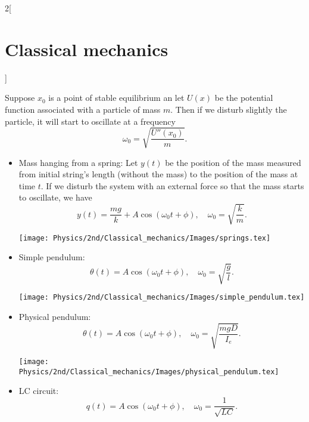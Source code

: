 \documentclass[../../../main.tex]{subfiles}
\begin{document}
\begin{multicols}{2}[\section{Classical mechanics}]
\begin{concept}
    Suppose $x_0$ is a point of stable equilibrium an let $U(x)$ be the potential function associated with a particle of mass $m$. Then if we disturb slightly the particle, it will start to oscillate at a frequency $$\omega_0=\sqrt{\frac{U''(x_0)}{m}}.$$
\end{concept}
\begin{concept}[Examples]
    \hfill
    \begin{itemize}
        \item Mass hanging from a spring: Let $y(t)$ be the position of the mass measured from initial string's length (without the mass) to the position of the mass at time $t$. If we disturb the system with an external force so that the mass starts to oscillate, we have $$y(t)=\frac{mg}{k}+A\cos(\omega_0t+\phi),\quad\omega_0=\sqrt{\frac{k}{m}}.$$
        \begin{minipage}{\linewidth} 
            \centering
            \texttt{[image: Physics/2nd/Classical\_mechanics/Images/springs.tex]} 
        \end{minipage}
        \item Simple pendulum: $$\theta(t)=A\cos(\omega_0t+\phi),\quad\omega_0=\sqrt{\frac{g}{l}}.$$
        \begin{minipage}{\linewidth} 
            \centering
            \texttt{[image: Physics/2nd/Classical\_mechanics/Images/simple\_pendulum.tex]} 
        \end{minipage}
        \item Physical pendulum: 
        $$\theta(t)=A\cos(\omega_0t+\phi),\quad\omega_0=\sqrt{\frac{mgD}{I_e}}.$$
        \begin{minipage}{\linewidth} 
            \centering
            \texttt{[image: Physics/2nd/Classical\_mechanics/Images/physical\_pendulum.tex]} 
        \end{minipage}
        \item LC circuit: $$q(t)=A\cos(\omega_0t+\phi),\quad\omega_0=\frac{1}{\sqrt{LC}}.$$
    \end{itemize}
\end{concept}

\end{multicols}
\end{document}
